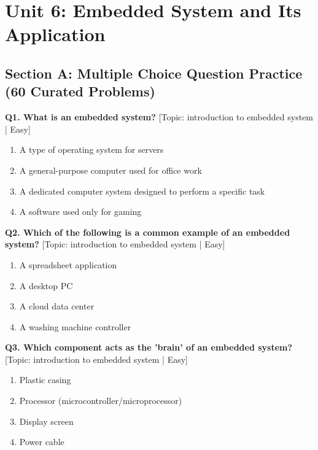 \chapter{Unit 6: Embedded System and Its Application}

\section{Section A: Multiple Choice Question Practice (60 Curated Problems)}

\noindent\textbf{Q1. What is an embedded system?} \hfill [Topic: introduction to embedded system | Easy]
\begin{enumerate}[label=(\alph*),topsep=2pt,itemsep=1pt,partopsep=0pt,parsep=0pt]
    \item {A type of operating system for servers}
    \item {A general-purpose computer used for office work}
    \item {A dedicated computer system designed to perform a specific task}
    \item {A software used only for gaming}
\end{enumerate}
\vspace{2mm}

\noindent\textbf{Q2. Which of the following is a common example of an embedded system?} \hfill [Topic: introduction to embedded system | Easy]
\begin{enumerate}[label=(\alph*),topsep=2pt,itemsep=1pt,partopsep=0pt,parsep=0pt]
    \item {A spreadsheet application}
    \item {A desktop PC}
    \item {A cloud data center}
    \item {A washing machine controller}
\end{enumerate}
\vspace{2mm}

\noindent\textbf{Q3. Which component acts as the 'brain' of an embedded system?} \hfill [Topic: introduction to embedded system | Easy]
\begin{enumerate}[label=(\alph*),topsep=2pt,itemsep=1pt,partopsep=0pt,parsep=0pt]
    \item {Plastic casing}
    \item {Processor (microcontroller/microprocessor)}
    \item {Display screen}
    \item {Power cable}
\end{enumerate}
\vspace{2mm}

